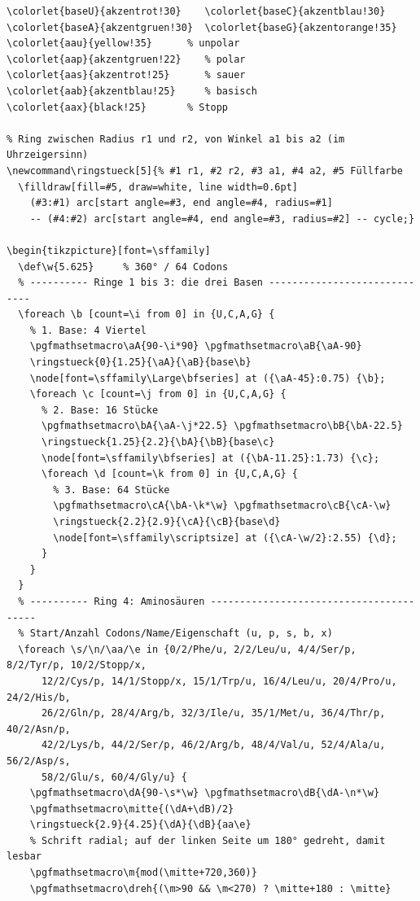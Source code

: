 \begin{lstlisting}[style=latex]
% Farben der Basen und der Aminosäure-Gruppen
\colorlet{baseU}{akzentrot!30}    \colorlet{baseC}{akzentblau!30}
\colorlet{baseA}{akzentgruen!30}  \colorlet{baseG}{akzentorange!35}
\colorlet{aau}{yellow!35}      % unpolar
\colorlet{aap}{akzentgruen!22}    % polar
\colorlet{aas}{akzentrot!25}      % sauer
\colorlet{aab}{akzentblau!25}     % basisch
\colorlet{aax}{black!25}       % Stopp

% Ring zwischen Radius r1 und r2, von Winkel a1 bis a2 (im Uhrzeigersinn)
\newcommand\ringstueck[5]{% #1 r1, #2 r2, #3 a1, #4 a2, #5 Füllfarbe
  \filldraw[fill=#5, draw=white, line width=0.6pt]
    (#3:#1) arc[start angle=#3, end angle=#4, radius=#1]
    -- (#4:#2) arc[start angle=#4, end angle=#3, radius=#2] -- cycle;}

\begin{tikzpicture}[font=\sffamily]
  \def\w{5.625}     % 360° / 64 Codons
  % ---------- Ringe 1 bis 3: die drei Basen -----------------------------
  \foreach \b [count=\i from 0] in {U,C,A,G} {
    % 1. Base: 4 Viertel
    \pgfmathsetmacro\aA{90-\i*90} \pgfmathsetmacro\aB{\aA-90}
    \ringstueck{0}{1.25}{\aA}{\aB}{base\b}
    \node[font=\sffamily\Large\bfseries] at ({\aA-45}:0.75) {\b};
    \foreach \c [count=\j from 0] in {U,C,A,G} {
      % 2. Base: 16 Stücke
      \pgfmathsetmacro\bA{\aA-\j*22.5} \pgfmathsetmacro\bB{\bA-22.5}
      \ringstueck{1.25}{2.2}{\bA}{\bB}{base\c}
      \node[font=\sffamily\bfseries] at ({\bA-11.25}:1.73) {\c};
      \foreach \d [count=\k from 0] in {U,C,A,G} {
        % 3. Base: 64 Stücke
        \pgfmathsetmacro\cA{\bA-\k*\w} \pgfmathsetmacro\cB{\cA-\w}
        \ringstueck{2.2}{2.9}{\cA}{\cB}{base\d}
        \node[font=\sffamily\scriptsize] at ({\cA-\w/2}:2.55) {\d};
      }
    }
  }
  % ---------- Ring 4: Aminosäuren ----------------------------------------
  % Start/Anzahl Codons/Name/Eigenschaft (u, p, s, b, x)
  \foreach \s/\n/\aa/\e in {0/2/Phe/u, 2/2/Leu/u, 4/4/Ser/p, 8/2/Tyr/p, 10/2/Stopp/x,
      12/2/Cys/p, 14/1/Stopp/x, 15/1/Trp/u, 16/4/Leu/u, 20/4/Pro/u, 24/2/His/b,
      26/2/Gln/p, 28/4/Arg/b, 32/3/Ile/u, 35/1/Met/u, 36/4/Thr/p, 40/2/Asn/p,
      42/2/Lys/b, 44/2/Ser/p, 46/2/Arg/b, 48/4/Val/u, 52/4/Ala/u, 56/2/Asp/s,
      58/2/Glu/s, 60/4/Gly/u} {
    \pgfmathsetmacro\dA{90-\s*\w} \pgfmathsetmacro\dB{\dA-\n*\w}
    \pgfmathsetmacro\mitte{(\dA+\dB)/2}
    \ringstueck{2.9}{4.25}{\dA}{\dB}{aa\e}
    % Schrift radial; auf der linken Seite um 180° gedreht, damit lesbar
    \pgfmathsetmacro\m{mod(\mitte+720,360)}
    \pgfmathsetmacro\dreh{(\m>90 && \m<270) ? \mitte+180 : \mitte}

\end{lstlisting}
